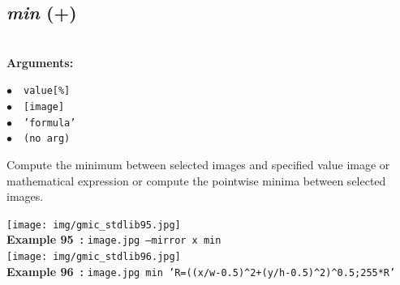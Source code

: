 \documentclass[a4paper,10.5pt,twoside]{book}
\def\comma{\discretionary{,}{}{,}}
\newcommand{\Cb}[1]{\textcolor{cb}{#1}}
\begin{document}
\subsection{\emph{min} (+)}\vspace*{-0.7em}
~\\\textbf{\Cb{Arguments: }}\begin{flushleft}
{\small \Cb{\hspace*{0.5cm}$\bullet$~~\texttt{value[\%]}}}~~~\\
{\small \Cb{\hspace*{0.5cm}$\bullet$~~\texttt{[image]}}}~~~\\
{\small \Cb{\hspace*{0.5cm}$\bullet$~~\texttt{'formula'}}}~~~\\
{\small \Cb{\hspace*{0.5cm}$\bullet$~~\texttt{(no arg)}}}\end{flushleft}
Compute the minimum between selected images and specified value{\comma} image or
mathematical expression{\comma} or compute the pointwise minima between selected images.
\begin{center}\texttt{[image: img/gmic\_stdlib95.jpg]}\\
{\footnotesize \textbf{Example 95~:} \texttt{image.jpg --mirror x min}}
\\\texttt{[image: img/gmic\_stdlib96.jpg]}\\
{\footnotesize \textbf{Example 96~:} \texttt{image.jpg min 'R=((x/w-0.5)\textasciicircum 2+(y/h-0.5)\textasciicircum 2)\textasciicircum 0.5;255*R'}}
\end{center}
\end{document}
